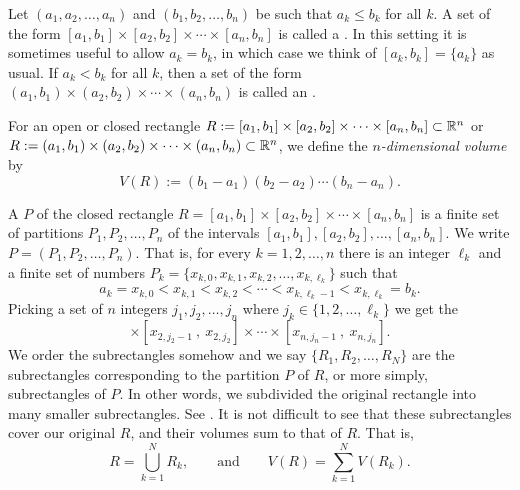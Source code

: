 \begin{defn}
Let $(a_1,a_2,\ldots,a_n)$ and
$(b_1,b_2,\ldots,b_n)$ be such that $a_k \leq b_k$ for all $k$.
A set of the form
$[a_1,b_1] \times
[a_2,b_2] \times \cdots \times
[a_n,b_n]$ is called a \emph{}.
In this setting it is sometimes useful to allow $a_k = b_k$, in which case we 
think of $[a_k,b_k] = \{ a_k \}$ as usual.
If $a_k < b_k$ for all $k$, then a set of the form
$(a_1,b_1) \times
(a_2,b_2) \times \cdots \times
(a_n,b_n)$ is called an \emph{}.

For an open or closed rectangle
$R := [a_1,b_1] \times
[a_2,b_2] \times \cdots \times
[a_n,b_n] \subset {\mathbb{R}}^n$
or
$R := (a_1,b_1) \times
(a_2,b_2) \times \cdots \times
(a_n,b_n) \subset {\mathbb{R}}^n$,
we define the
\emph{$n$-dimensional volume}%
%
 by
\begin{equation*}
V(R) :=
(b_1-a_1)
(b_2-a_2)
\cdots
(b_n-a_n) .
\end{equation*}

A \emph{} $P$ of the closed rectangle
$R = [a_1,b_1] \times
[a_2,b_2] \times \cdots \times
[a_n,b_n]$
is
a finite set of 
partitions $P_1,P_2,\ldots,P_n$ of the intervals
$[a_1,b_1], [a_2,b_2],\ldots, [a_n,b_n]$.
We write $P=(P_1,P_2,\ldots,P_n)$.
That is, for every $k=1,2,\ldots,n$ there is an integer $\ell_k$ and
a finite set of numbers
$P_k = \{ x_{k,0},x_{k,1},x_{k,2},\ldots,x_{k,\ell_k} \}$ such that
\begin{equation*}
a_k = x_{k,0} < x_{k,1} < x_{k,2} < \cdots < x_{k,{\ell_k}-1} < x_{k,\ell_k} = b_k .
\end{equation*}
Picking a set of $n$ integers $j_1,j_2,\ldots,j_n$ where
$j_k \in \{ 1,2,\ldots,\ell_k \}$ we get
the
\emph{}
\begin{equation*}
[x_{1,j_1-1}~,~ x_{1,j_1}]
\times
[x_{2,j_2-1}~,~ x_{2,j_2}]
\times
\cdots
\times
[x_{n,j_n-1}~,~ x_{n,j_n}] .
\end{equation*}
We order the subrectangles somehow and
we say $\{R_1,R_2,\ldots,R_N\}$ are the subrectangles corresponding
to the partition $P$ of $R$, or more simply, subrectangles of
$P$.
In other words, we subdivided the original rectangle into many smaller
subrectangles.  See .  It is not difficult to see that
these subrectangles cover our original $R$, and their
volumes sum to that of $R$.  That is,
\begin{equation*}
R= \bigcup_{k=1}^N R_k , \qquad \text{and} \qquad
V(R) = \sum_{k=1}^N V(R_k).
\end{equation*}


\end{defn}
